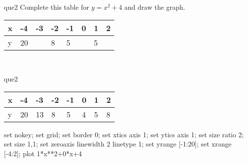 \documentclass[13.5pt, varwidth=true]{beamer}
\begin{document}
\begin{frame}[shrink=19,fragile]
	\begin{beamercolorbox}[rounded=true, left, shadow=true,wd=14.8cm]{que2}
		 Complete this table for $y = x^{2} + 4$ and draw the graph. \\[0.3cm] \renewcommand{\arraystretch}{1.2}\begin{tabular}{|C|C|C|C|C|C|C|C|} \hline x & -4 & -3 & -2 & -1 & 0 & 1 & 2 \\ \hline y & 20 &  & 8 & 5 &  & 5 & \\ \hline \end{tabular}\\[0.3cm]
	\end{beamercolorbox}
\end{frame}
\begin{frame}[shrink=19,fragile]
	\begin{beamercolorbox}[rounded=true, left, shadow=true,wd=14.8cm]{que2}
		\renewcommand{\arraystretch}{1.2}\begin{tabular}{|C|C|C|C|C|C|C|C|} \hline x & -4 & -3 & -2 & -1 & 0 & 1 & 2 \\ \hline y & 20 & 13 & 8 & 5 & 4 & 5 & 8\\ \hline \end{tabular}\begin{gnuplot}[terminal=pdf] set nokey; set grid; set border 0; set xtics axis 1; set ytics axis 1; set size ratio 2; set size 1,1; set zeroaxis linewidth 2 linetype 1; set yrange [-1:20]; set xrange [-4:2]; plot 1*x**2+0*x+4 \end{gnuplot}
	\end{beamercolorbox}
\end{frame}
\end{document}
